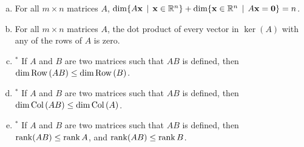 \begin{prob}
\begin{enumerate}[a)]
\item For all $m\times n$ matrices $A$, $\dim \{A\mathbf{x}\,\mid \, \mathbf{x}\in \mathbb{R}^n \} + \dim\{\mathbf{x} \in \mathbb{R}^n \,\mid \, A\mathbf{x}=\mathbf{0} \}= n$.
\medskip
%
\item\sov For all $m\times n$ matrices $A$, the dot product of every vector in $\ker(A)$ with any of the rows of $A$ is zero.
\medskip
%
\item$^\ast$ If $A$ and $B$ are two matrices such that $AB$ is defined, then $\dim \operatorname{Row\,}(AB) \leq \dim \operatorname{Row\,}(B)$. 
\medskip
%
\item$^\ast$ If $A$ and $B$ are two matrices such that $AB$ is defined, then $\dim \operatorname{Col\,}(AB) \leq \dim \operatorname{Col\,}(A)$.
\medskip
%
\item$^\ast$ If $A$ and $B$ are two matrices such that $AB$ is defined, then $\operatorname{rank}(AB) \leq \operatorname{rank} A$, and $\operatorname{rank}(AB) \leq \operatorname{rank} B$. 
%
\end{enumerate}
\end{prob}

